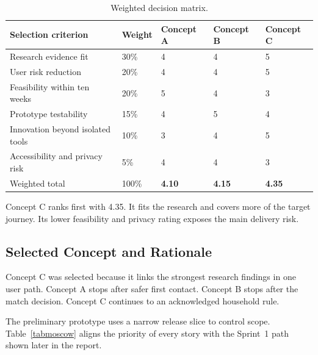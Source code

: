 \documentclass[11pt,a4paper]{article}
\begin{document}
\begin{table}[H]
    \centering
    \small
    \caption{Weighted decision matrix.}
    \begin{tabularx}{\textwidth}{@{}Y L{1.5cm}L{1.7cm}L{1.7cm}L{1.7cm}@{}}
        \toprule
        Selection criterion & Weight & Concept A & Concept B & Concept C\\
        \midrule
        Research evidence fit & 30\% & 4 & 4 & 5\\
        User risk reduction & 20\% & 4 & 4 & 5\\
        Feasibility within ten weeks & 20\% & 5 & 4 & 3\\
        Prototype testability & 15\% & 4 & 5 & 4\\
        Innovation beyond isolated tools & 10\% & 3 & 4 & 5\\
        Accessibility and privacy risk & 5\% & 4 & 4 & 3\\
        \midrule
        Weighted total & 100\% & \textbf{4.10} & \textbf{4.15} & \textbf{4.35}\\
        \bottomrule
    \end{tabularx}
    \label{tabconceptselection}
\end{table}

Concept C ranks first with 4.35. It fits the research and covers more of the target journey. Its lower feasibility and privacy rating exposes the main delivery risk.

\subsection{Selected Concept and Rationale}

Concept C was selected because it links the strongest research findings in one user path. Concept A stops after safer first contact. Concept B stops after the match decision. Concept C continues to an acknowledged household rule.

The preliminary prototype uses a narrow release slice to control scope. Table~\ref{tabmoscow} aligns the priority of every story with the Sprint~1 path shown later in the report.
\end{document}
